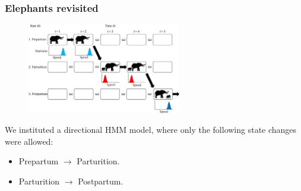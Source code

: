 \documentclass[main.tex]{subfiles}
\begin{document}
\begin{frame}
\frametitle{Elephants revisited}

\begin{figure}
    \centering
    \includegraphics[width=0.6\textwidth]{figures/elephant_parturition.jpg}
\end{figure}

We instituted a directional HMM model, where only the following state changes were allowed:

\begin{itemize}
    \item Prepartum $\rightarrow$ Parturition.
    \item Parturition $\rightarrow$ Postpartum.
\end{itemize}

\end{frame}
\end{document}
